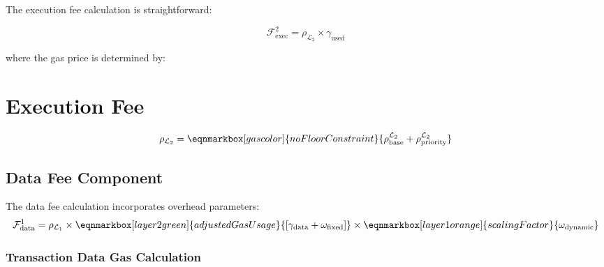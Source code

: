 \documentclass[letterpaper,10pt]{article} %
\newcommand{\layer}[1]{\mathcal{L}_{#1}}
\newcommand{\fee}[2]{\mathcal{F}_{#1}^{#2}}
\begin{document}
The execution fee calculation is straightforward:

\begin{equation}
\fee{\text{exec}}{2} = \rho_{\layer{2}} \times \gamma_{\text{used}}
\end{equation}

where the gas price is determined by:
\medskip

\section{Execution Fee}
\addvspace{1cm}
\begin{equation}
    \label{eq:optimism_gas_price}
    \rho_{\layer{2}} = 
    \eqnmarkbox[gascolor]{noFloorConstraint}{\rho_{\text{base}}^{\layer{2}} + \rho_{\text{priority}}^{\layer{2}}}
\end{equation}

\newpage
\vspace{\baselineskip} %
\subsection{Data Fee Component} %

The data fee calculation incorporates overhead parameters:
\begin{equation}
    \label{eq:optimism_data_fee}
    \fee{\text{data}}{1} = \rho_{\layer{1}} \times 
    \eqnmarkbox[layer2green]{adjustedGasUsage}{\left[\gamma_{\text{data}} + \omega_{\text{fixed}}\right]} \times 
    \eqnmarkbox[layer1orange]{scalingFactor}{\omega_{\text{dynamic}}}
\end{equation}


\subsubsection{Transaction Data Gas Calculation} %
\end{document}
